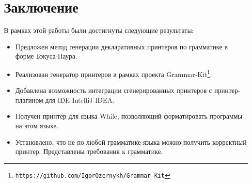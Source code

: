 \section*{Заключение}

В рамках этой работы были достигнуты следующие результаты:
\begin{itemize}
    \item Предложен метод генерации декларативных принтеров по грамматике в форме Бэкуса-Наура.
    \item Реализован генератор принтеров в рамках проекта Grammar-Kit\footnote{\texttt{https://github.com/IgorOzernykh/Grammar-Kit}}.
    \item Добавлена возможность интеграции сгенерированных принтеров с принтер-плагином для IDE IntelliJ IDEA.
    \item Получен принтер для языка While, позволяющий форматировать программы на этом языке.
    \item Установлено, что не по любой грамматике языка можно получить корректный принтер. Представлены требования к грамматике.
\end{itemize}